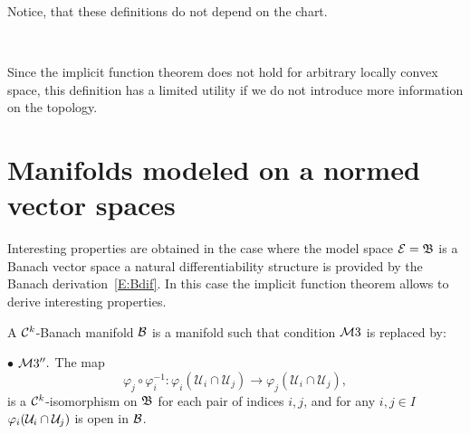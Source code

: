 \noindent

Notice, that these definitions do not depend on the chart.

\,
\begin{remark}
Since the implicit function theorem does not hold for arbitrary locally convex space, this definition has a limited utility if we do not introduce   more information on the topology.
\end{remark}


\section{Manifolds modeled on a normed vector spaces}

Interesting properties are obtained
in the case where the model space $\mathcal{E}=\mathfrak{B}$ is a Banach vector space a natural  differentiability structure is provided by the Banach derivation~\eqref{E:Bdif}. In this case the implicit function theorem allows to derive interesting properties.



\begin{definition}
A $\mathcal{C}^k$-Banach manifold $\mathcal{B}$ is a manifold such that condition $\mathcal{M} 3$ is  replaced by: 

\vspace{3pt}
$\bullet$ $\mathcal{M} 3''.$ The map
\[
\varphi_j\circ\varphi_i^{-1}:\varphi_i(\mathcal{U}_i\cap \mathcal{U}_j) \to \varphi_j(\mathcal{U}_i\cap
\mathcal{U}_j),
\]
is a $\mathcal{C}^{k}$-isomorphism on $\mathfrak{B}$ for each pair of indices $i,j$, and for any
$i,j\in I$
$\varphi_i(\mathcal{U}_i\cap \mathcal{U}_j)$ is open in $\mathcal{B}$.
\end {definition}




